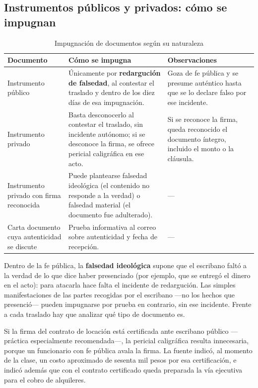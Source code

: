 \documentclass[12pt,oneside]{book}
\begin{document}
\subsection{Instrumentos públicos y privados: cómo se impugnan}

\begin{table}[H]
\centering
\caption{Impugnación de documentos según su naturaleza}
\begin{tabularx}{\textwidth}{>{\raggedright\arraybackslash}p{} >{\raggedright\arraybackslash}X >{\raggedright\arraybackslash}X}
\toprule
\textbf{Documento} & \textbf{Cómo se impugna} & \textbf{Observaciones} \\
\midrule
Instrumento público & Únicamente por \textbf{redargución de falsedad}, al contestar el traslado y dentro de los diez días de esa impugnación. & Goza de fe pública y se presume auténtico hasta que se lo declare falso por ese incidente. \\
Instrumento privado & Basta desconocerlo al contestar el traslado, sin incidente autónomo; si se desconoce la firma, se ofrece pericial caligráfica en ese acto. & Si se reconoce la firma, queda reconocido el documento íntegro, incluido el monto o la cláusula. \\
Instrumento privado con firma reconocida & Puede plantearse falsedad ideológica (el contenido no responde a la verdad) o falsedad material (el documento fue adulterado). & --- \\
Carta documento cuya autenticidad se discute & Prueba informativa al correo sobre autenticidad y fecha de recepción. & --- \\
\bottomrule
\end{tabularx}
\end{table}

Dentro de la fe pública, la \textbf{falsedad ideológica} supone que el escribano faltó a la verdad de lo que dice haber presenciado (por ejemplo, que se entregó el dinero en el acto): para atacarla hace falta el incidente de redargución. Las simples manifestaciones de las partes recogidas por el escribano ---no los hechos que presenció--- pueden impugnarse por prueba en contrario, sin ese incidente. Frente a cada traslado hay que analizar qué tipo de documento es.

\begin{important}
Si la firma del contrato de locación está certificada ante escribano público ---práctica especialmente recomendada---, la pericial caligráfica resulta innecesaria, porque un funcionario con fe pública avala la firma. La fuente indicó, al momento de la clase, un costo aproximado de sesenta mil pesos por esa certificación, e indicó además que con el contrato certificado queda preparada la vía ejecutiva para el cobro de alquileres.
\end{important}
\end{document}
